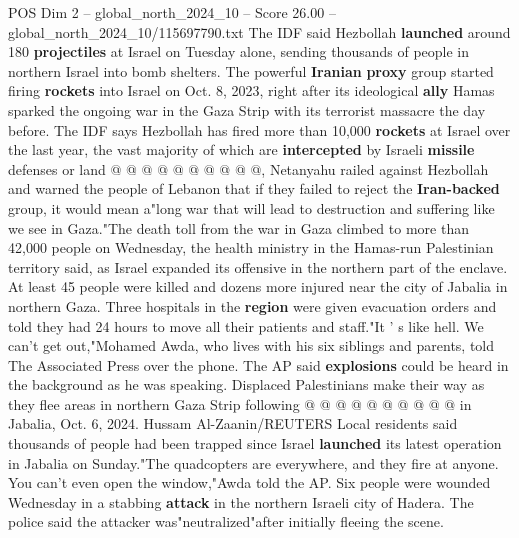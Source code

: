 \begin{textsample}{POS Dim 2 – global\_north\_2024\_10 – Score 26.00 – global\_north\_2024\_10/115697790.txt}
The IDF said Hezbollah \textbf{launched} around 180 \textbf{projectiles} at Israel on Tuesday alone, sending thousands of people in northern Israel into bomb shelters.
The powerful \textbf{Iranian} \textbf{proxy} group started firing \textbf{rockets} into Israel on Oct. 8, 2023, right after its ideological \textbf{ally} Hamas sparked the ongoing war in the Gaza Strip with its terrorist massacre the day before.
The IDF says Hezbollah has fired more than 10,000 \textbf{rockets} at Israel over the last year, the vast majority of which are \textbf{intercepted} by Israeli \textbf{missile} defenses or land @ @ @ @ @ @ @ @ @ @, Netanyahu railed against Hezbollah and warned the people of Lebanon that if they failed to reject the \textbf{Iran-backed} group, it would mean a"long war that will lead to destruction and suffering like we see in Gaza."The death toll from the war in Gaza climbed to more than 42,000 people on Wednesday, the health ministry in the Hamas-run Palestinian territory said, as Israel expanded its offensive in the northern part of the enclave.
At least 45 people were killed and dozens more injured near the city of Jabalia in northern Gaza.
Three hospitals in the \textbf{region} were given evacuation orders and told they had 24 hours to move all their patients and staff."It ' s like hell.
We can't get out,"Mohamed Awda, who lives with his six siblings and parents, told The Associated Press over the phone.
The AP said \textbf{explosions} could be heard in the background as he was speaking.
Displaced Palestinians make their way as they flee areas in northern Gaza Strip following @ @ @ @ @ @ @ @ @ @ in Jabalia, Oct. 6, 2024.
Hussam Al-Zaanin/REUTERS Local residents said thousands of people had been trapped since Israel \textbf{launched} its latest operation in Jabalia on Sunday."The quadcopters are everywhere, and they fire at anyone.
You can't even open the window,"Awda told the AP.
Six people were wounded Wednesday in a stabbing \textbf{attack} in the northern Israeli city of Hadera.
The police said the attacker was"neutralized"after initially fleeing the scene.

\end{textsample}
